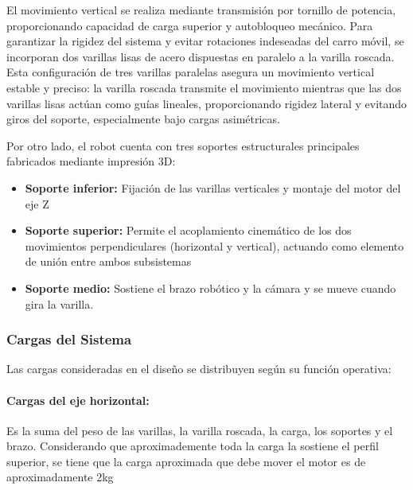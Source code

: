 El movimiento vertical se realiza mediante transmisión por tornillo de potencia, proporcionando capacidad de carga superior y autobloqueo mecánico. Para garantizar la rigidez del sistema y evitar rotaciones indeseadas del carro móvil, se incorporan dos varillas lisas de acero dispuestas en paralelo a la varilla roscada. Esta configuración de tres varillas paralelas asegura un movimiento vertical estable y preciso: la varilla roscada transmite el movimiento mientras que las dos varillas lisas actúan como guías lineales, proporcionando rigidez lateral y evitando giros del soporte, especialmente bajo cargas asimétricas.

Por otro lado, el robot cuenta con tres soportes estructurales principales fabricados mediante impresión 3D:

\begin{itemize}
    \item \textbf{Soporte inferior:} Fijación de las varillas verticales y montaje del motor del eje Z
    \item \textbf{Soporte superior:} Permite el acoplamiento cinemático de los dos movimientos perpendiculares (horizontal y vertical), actuando como elemento de unión entre ambos subsistemas
    \item \textbf{Soporte medio:} Sostiene el brazo robótico y la cámara y se mueve cuando gira la varilla.
\end{itemize}

\subsubsection{Cargas del Sistema}

Las cargas consideradas en el diseño se distribuyen según su función operativa:

\paragraph{Cargas del eje horizontal:}
Es la suma del peso de las varillas, la varilla roscada, la carga, los soportes y el brazo. Considerando que aproximademente toda la carga la sostiene el perfil superior, se tiene que la carga aproximada que debe mover el motor es de aproximadamente 2kg

